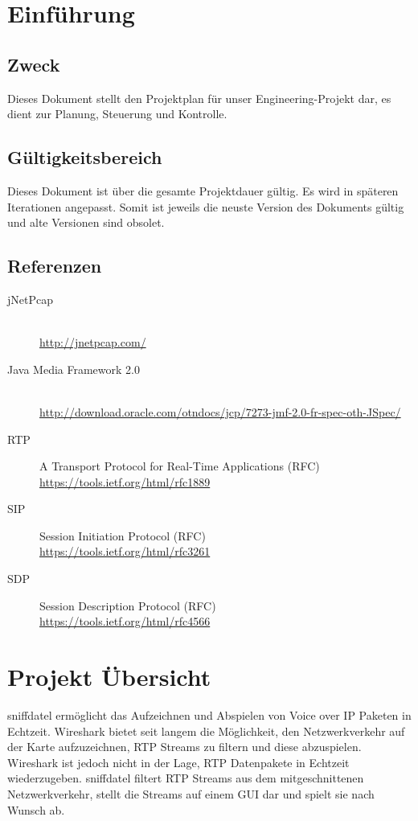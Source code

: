 \documentclass[a4,12pt]{scrartcl}
\begin{document}
\section{Einführung}
\subsection{Zweck}
Dieses Dokument stellt den Projektplan für unser Engineering-Projekt dar, es dient zur Planung, Steuerung und Kontrolle.
\subsection{Gültigkeitsbereich}
Dieses Dokument ist über die gesamte Projektdauer gültig. Es wird in späteren Iterationen angepasst. Somit ist jeweils die neuste Version des Dokuments gültig und alte Versionen sind obsolet.
\subsection{Referenzen}
\begin{description}
  \item[jNetPcap] \hfill \\
  \url{http://jnetpcap.com/}
  \item[Java Media Framework 2.0] \hfill \\
  \url{http://download.oracle.com/otndocs/jcp/7273-jmf-2.0-fr-spec-oth-JSpec/}
  \item[RTP] A Transport Protocol for Real-Time Applications (RFC) \hfill \\
  \url{https://tools.ietf.org/html/rfc1889}
  \item[SIP] Session Initiation Protocol (RFC) \hfill \\
  \url{https://tools.ietf.org/html/rfc3261}
  \item[SDP] Session Description Protocol (RFC) \hfill \\
  \url{https://tools.ietf.org/html/rfc4566}
\end{description}

\section{Projekt Übersicht}
sniffdatel ermöglicht das Aufzeichnen und Abspielen von Voice over IP Paketen in Echtzeit. Wireshark bietet seit langem die Möglichkeit, den Netzwerkverkehr auf der Karte aufzuzeichnen, RTP Streams zu filtern und diese abzuspielen. Wireshark ist jedoch nicht in der Lage, RTP Datenpakete in Echtzeit wiederzugeben. sniffdatel filtert RTP Streams aus dem mitgeschnittenen Netzwerkverkehr, stellt die Streams auf einem GUI dar und spielt sie nach Wunsch ab. 
\end{document}
